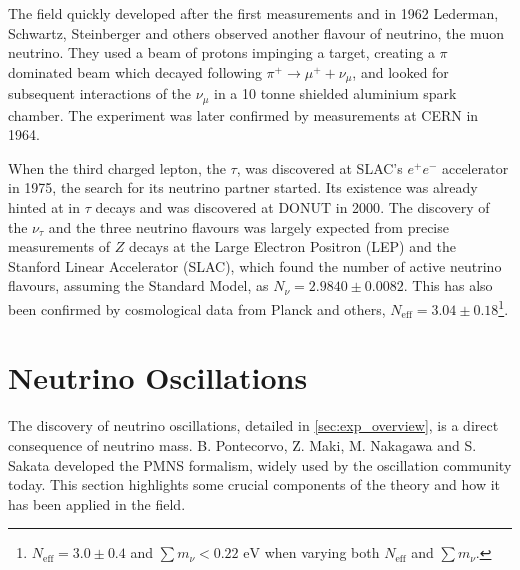 The field quickly developed after the first measurements and in 1962 Lederman, Schwartz, Steinberger and others\cite{lederman} observed another flavour of neutrino, the muon neutrino. They used a beam of protons impinging a target, creating a $\pi$ dominated beam which decayed following $\pi^+ \rightarrow \mu^+ + \nu_\mu$, and looked for subsequent interactions of the $\nu_\mu$ in a 10 tonne shielded aluminium spark chamber. The experiment was later confirmed by measurements at CERN in 1964\cite{cern_spark,cern_spark2}.

When the third charged lepton, the $\tau$, was discovered at SLAC's $e^+e^-$ accelerator in 1975\cite{tau_disc}, the search for its neutrino partner started. Its existence was already hinted at in $\tau$ decays and was discovered at DONUT in 2000\cite{tau_nu_disc}. The discovery of the $\nu_\tau$ and the three neutrino flavours was largely expected from precise measurements of $Z$ decays at the Large Electron Positron (LEP) and the Stanford Linear Accelerator (SLAC), which found the number of active neutrino flavours, assuming the Standard Model, as $N_\nu = 2.9840\pm0.0082$\cite{lep}. This has also been confirmed by cosmological data from Planck and others, $N_\text{eff} = 3.04\pm0.18$\footnote{$N_\text{eff}=3.0\pm0.4$ and $\sum m_\nu < 0.22 \text{ eV}$ when varying both $N_\text{eff}$ and $\sum m_\nu$.}\cite{planck}.

\section{Neutrino Oscillations}
\label{sec:theory:osc}
The discovery of neutrino oscillations, detailed in \autoref{sec:exp_overview}, is a direct consequence of neutrino mass. B. Pontecorvo\cite{p1,p2,pontecorvo_gribov}, Z. Maki, M. Nakagawa and S. Sakata\cite{mns} developed the PMNS formalism, widely used by the oscillation community today. This section highlights some crucial components of the theory and how it has been applied in the field.

